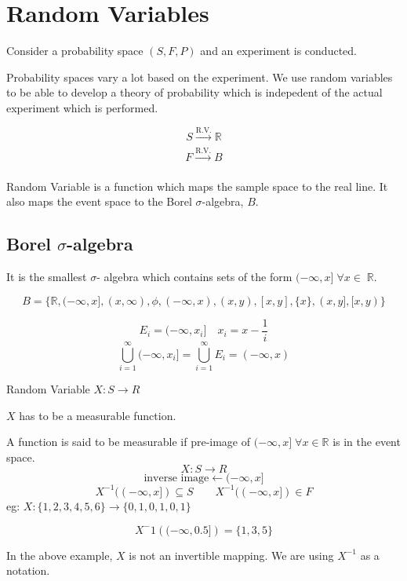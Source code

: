 \documentclass{article}
\begin{document}


\section{Random Variables}

Consider a probability space $(S,F,P)$ and an experiment is conducted.

Probability spaces vary a lot based on the experiment. We use random variables to be able to develop a theory of probability which is indepedent of the actual experiment which is performed.

$$S \xrightarrow[]{\text{R.V.}} \mathbb{R}$$
$$F \xrightarrow[]{\text{R.V.}} B$$

Random Variable is a function which maps the sample space to the real line.
It also maps the event space to the Borel $\sigma$-algebra, $B$.

\subsection{Borel $\sigma$-algebra}
It is the smallest $\sigma$- algebra which contains sets of the form $(-\infty ,x]\; \forall x \in \; \mathbb{R}$.

$$ B=\{ \mathbb{R} , (-\infty ,x] ,(x,\infty ), \phi, (-\infty,x) ,(x,y),[x,y], \{x\},(x,y],[x,y)\}$$

$$ E_i =(-\infty ,x_i] \quad x_i = x-\frac{1}{i}$$
$$ \bigcup_{i=1}^{\infty}(-\infty ,x_i] = \bigcup_{i=1}^{\infty} E_i =(-\infty ,x)$$


Random Variable $X:S \rightarrow R$

$X$ has to be a measurable function.

A function is said to be measurable if  pre-image of $(-\infty ,x ] \; \forall x \in \mathbb{R}$ is in the event space.
$$X:S \rightarrow R$$
$$\text{inverse image} \leftarrow(-\infty ,x ] $$
$$ X^{-1} ((-\infty ,x ]) \subseteq S \qquad  X^{-1} ((-\infty ,x ]) \in F$$
eg:
$ X: \{1,2,3,4,5,6\} \rightarrow \{0,1,0,1,0,1 \}$

$$X^-1\left( (-\infty, 0.5]\right)=\{1,3,5\}$$

In the above example, $X$ is not an invertible mapping. We are using $X^{-1}$ as a notation.
\end{document}
